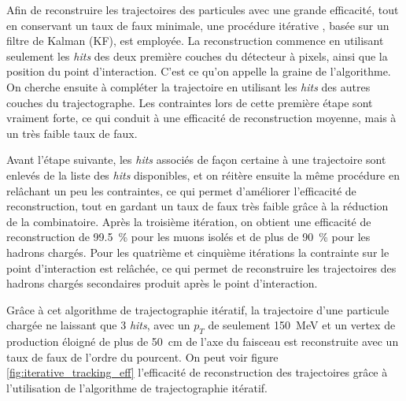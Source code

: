 Afin de reconstruire les trajectoires des particules avec une grande efficacité, tout en conservant un taux de faux minimale, une procédure itérative \citep{cms_tracks}, basée sur un filtre de Kalman (KF), est employée. La reconstruction commence en utilisant seulement les \emph{hits} des deux première couches du détecteur à pixels, ainsi que la position du point d'interaction. C'est ce qu'on appelle la graine de l'algorithme. On cherche ensuite à compléter la trajectoire en utilisant les \emph{hits} des autres couches du trajectographe. Les contraintes lors de cette première étape sont vraiment forte, ce qui conduit à une efficacité de reconstruction moyenne, mais à un très faible taux de faux.

Avant l'étape suivante, les \emph{hits} associés de façon certaine à une trajectoire sont enlevés de la liste des \emph{hits} disponibles, et on réitère ensuite la même procédure en relâchant un peu les contraintes, ce qui permet d'améliorer l'efficacité de reconstruction, tout en gardant un taux de faux très faible grâce à la réduction de la combinatoire. Après la troisième itération, on obtient une efficacité de reconstruction de \SI{99.5}{\%} pour les muons isolés et de plus de \SI{90}{\%} pour les hadrons chargés. Pour les quatrième et cinquième itérations la contrainte sur le point d'interaction est relâchée, ce qui permet de reconstruire les trajectoires des hadrons chargés secondaires produit après le point d'interaction.

Grâce à cet algorithme de trajectographie itératif, la trajectoire d'une particule chargée ne laissant que 3 \emph{hits}, avec un $p_T$ de seulement \SI{150}{\MeV} et un vertex de production éloigné de plus de \SI{50}{\cm} de l'axe du faisceau est reconstruite avec un taux de faux de l'ordre du pourcent. On peut voir figure \ref{fig:iterative_tracking_eff} l'efficacité de reconstruction des trajectoires grâce à l'utilisation de l'algorithme de trajectographie itératif.

